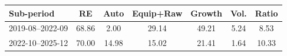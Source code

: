 \begin{tabular}{lcccccc}
\toprule
\textbf{Sub-period} & RE & Auto & Equip+Raw & Growth & Vol. & Ratio \\
\midrule
2019-08--2022-09 & 68.86 & 2.00 & 29.14 & 49.21 & 5.24 & 8.53 \\
2022-10--2025-12 & 70.00 & 14.98 & 15.02 & 21.41 & 1.64 & 10.33 \\
\bottomrule
\end{tabular}
